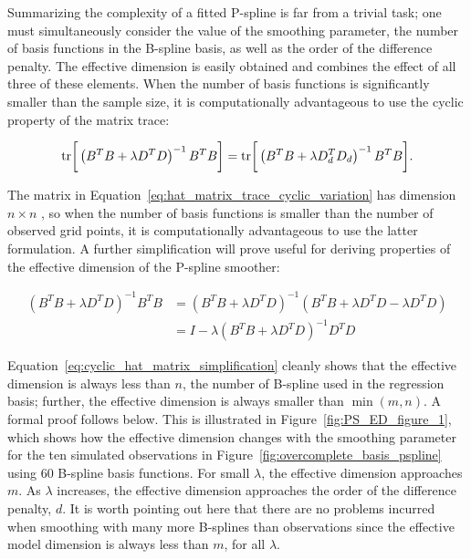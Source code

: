 \documentclass[12pt]{article}
\theoremstyle{definition}
\begin{document}
Summarizing the complexity of a fitted P-spline is far from a trivial task; one must simultaneously consider the value of the smoothing parameter, the number of basis functions in the B-spline basis, as well as the order of the difference penalty. The effective dimension  is easily obtained and combines the effect of all three of these elements. When the number of basis functions is significantly smaller than the sample size, it is computationally advantageous to use the cyclic property of the matrix trace: 

\begin{equation}\label{eq:hat_matrix_trace_cyclic_variation}
\textup{tr}\bigg[\left( B^T B + \lambda D^T D \right)^{-1} B^T B \bigg] = \textup{tr}\bigg[ \left(B^TB + \lambda D_d^T D_d \right)^{-1} B^TB\bigg].
\end{equation}

The matrix in Equation~\ref{eq:hat_matrix_trace_cyclic_variation} has dimension $n \times n$ , so when the number of basis functions is smaller than the number of observed grid points, it is computationally advantageous to use the latter formulation. A further simplification will prove useful for deriving properties of the effective dimension of the P-spline smoother:

\begin{align} 
\left(B^T B + \lambda D^T D \right)^{-1} B^T B &= \left(B^T B + \lambda D^T D \right)^{-1} \left( B^T B + \lambda D^T D - \lambda D^T D\right) \nonumber \\
&= I - \lambda\left(B^T B + \lambda D^T D \right)^{-1} D^T D \label{eq:cyclic_hat_matrix_simplification}
\end{align}

Equation~\ref{eq:cyclic_hat_matrix_simplification} cleanly shows that the effective dimension is always less than $n$, the number of B-spline used in the regression basis; further, the effective dimension is always smaller than $\min\left(m,n\right)$. A formal proof follows below. This is illustrated in Figure~\ref{fig:PS_ED_figure_1}, which shows how the effective dimension changes with the smoothing parameter for the ten simulated observations in Figure~\ref{fig:overcomplete_basis_pspline} using 60 B-spline basis functions. For small $\lambda$, the effective dimension approaches $m$. As $\lambda$ increases, the effective dimension approaches the order of the difference penalty, $d$. It is worth pointing out here that there are no problems incurred when smoothing with many more B-splines than observations since the effective model dimension is always less than $m$, for all $\lambda$. 
\end{document}
